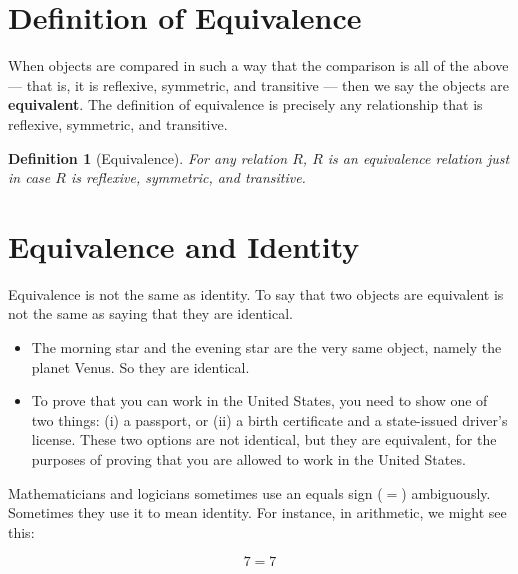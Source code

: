 \documentclass{book}
\numberwithin{equation}{chapter}
\newcommand{\vocab}{\textbf}
\newtheorem{definition}{Definition}
\begin{document}
\section{Definition of Equivalence}

When objects are compared in such a way that the comparison is all of the above --- that is, it is reflexive, symmetric, and transitive --- then we say the objects are \vocab{equivalent}. The definition of equivalence is precisely any relationship that is reflexive, symmetric, and transitive.

\begin{definition}[Equivalence]
For any relation $R$, $R$ is an equivalence relation just in case $R$ is reflexive, symmetric, and transitive.
\end{definition}


\section{Equivalence and Identity}

Equivalence is not the same as identity. To say that two objects are equivalent is not the same as saying that they are identical. 

\begin{itemize}
\item{The morning star and the evening star are the very same object, namely the planet Venus. So they are identical.}
\item{To prove that you can work in the United States, you need to show one of two things: (i) a passport, or (ii) a birth certificate and a state-issued driver's license. These two options are not identical, but they are equivalent, for the purposes of proving that you are allowed to work in the United States.}
\end{itemize}

\noindent
Mathematicians and logicians sometimes use an equals sign ($=$) ambiguously. Sometimes they use it to mean identity. For instance, in arithmetic, we might see this:

\begin{equation}
7 = 7
\end{equation}
\end{document}
